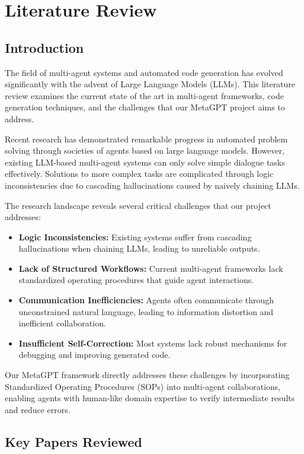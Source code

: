 \chapter{Literature Review}

\section{Introduction}

The field of multi-agent systems and automated code generation has evolved significantly with the advent of Large Language Models (LLMs). This literature review examines the current state of the art in multi-agent frameworks, code generation techniques, and the challenges that our MetaGPT project aims to address.

Recent research has demonstrated remarkable progress in automated problem solving through societies of agents based on large language models. However, existing LLM-based multi-agent systems can only solve simple dialogue tasks effectively. Solutions to more complex tasks are complicated through logic inconsistencies due to cascading hallucinations caused by naively chaining LLMs.

The research landscape reveals several critical challenges that our project addresses:

\begin{itemize}
    \item \textbf{Logic Inconsistencies:} Existing systems suffer from cascading hallucinations when chaining LLMs, leading to unreliable outputs.
    \item \textbf{Lack of Structured Workflows:} Current multi-agent frameworks lack standardized operating procedures that guide agent interactions.
    \item \textbf{Communication Inefficiencies:} Agents often communicate through unconstrained natural language, leading to information distortion and inefficient collaboration.
    \item \textbf{Insufficient Self-Correction:} Most systems lack robust mechanisms for debugging and improving generated code.
\end{itemize}

Our MetaGPT framework directly addresses these challenges by incorporating Standardized Operating Procedures (SOPs) into multi-agent collaborations, enabling agents with human-like domain expertise to verify intermediate results and reduce errors.

\section{Key Papers Reviewed}

